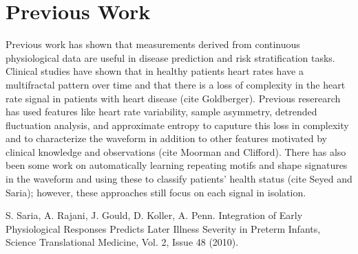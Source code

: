 \documentclass[dvips,12pt]{article}
\begin{document}
\section{Previous Work}
Previous work has shown that measurements derived from continuous physiological data are useful in disease prediction and risk stratification tasks. Clinical studies have shown that in healthy patients heart rates have a multifractal pattern over time and that there is a loss of complexity in the heart rate signal in patients with heart disease (cite Goldberger). Previous reserearch has used features like heart rate variability, sample asymmetry, detrended fluctuation analysis, and approximate entropy to caputure this loss in complexity and to characterize the waveform in addition to other features motivated by clinical knowledge and observations (cite Moorman and Clifford).  There has also been some work on automatically learning repeating motifs and shape signatures in  the waveform and using these to classify patients' health status (cite Seyed and Saria); however, these approaches still focus on each signal in isolation.



\begin{thebibliography}{99}
 S. Saria, 
A. Rajani, 
J. Gould, 
D. Koller, 
A. Penn. 
{Integration of Early Physiological Responses Predicts Later Illness Severity in Preterm Infants},
Science Translational Medicine, Vol. 2, Issue 48 (2010).

\end{thebibliography}
\end{document}
